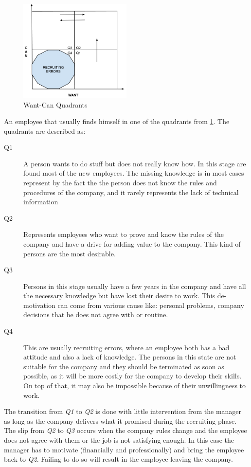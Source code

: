 \begin{figure}[h]
\centering
\includegraphics[width=0.5\textwidth]{img/wantcan.png}
\caption{Want-Can Quadrants}
\label{fig:quadrants}
\end{figure}

An employee that usually finds himself in one of the quadrants from \cref{fig:quadrants}. The quadrants are described as:

\begin{description}
\item[Q1] A person wants to do stuff but does not really know how. In this stage are found most of the new employees. The missing knowledge is in most cases represent by the fact the the person does not know the rules and procedures of the company, and it rarely represents the lack of technical information
\item[Q2] Represents employees who want to prove and know the rules of the company and have a drive for adding value to the company. This kind of persons are the most desirable.
\item[Q3] Persons in this stage usually have a few years in the company and have all the necessary knowledge but have lost their desire to work. This de-motivation can come from various cause like: personal problems, company decisions that he does not agree with or routine.
\item[Q4] This are usually recruiting errors, where an employee both has a bad attitude and also a lack of knowledge. The persons in this state are not suitable for the company and they should be terminated as soon as possible, as it will be more costly for the company to develop their skills. On top of that, it may also be impossible because of their unwillingness to work.
\end{description}

The transition from \textit{Q1} to \textit{Q2} is done with little intervention from the manager as long as the company delivers what it promised during the recruiting phase. The slip from \textit{Q2} to \textit{Q3} occurs when the company rules change and the employee does not agree with them or the job is not satisfying enough. In this case the manager has to motivate (financially and professionally) and bring the employee back to \textit{Q2}. Failing to do so will result in the employee leaving the company.
